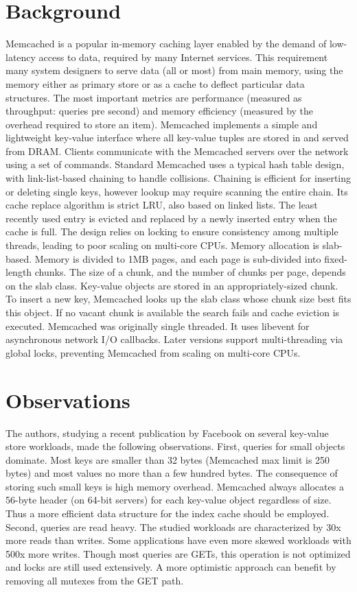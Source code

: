 \documentclass[letterpaper,twocolumn,10pt]{article}
\begin{document}
\section{Background}
Memcached is a popular in-memory caching layer enabled by the demand of low-latency access to data, required by many Internet services. This requirement many system designers to serve data (all or most) from main memory, using the memory either as primary store or as a cache to deflect particular data structures.
The most important metrics are performance (measured as throughput: queries pre second) and memory efficiency (measured by the overhead required to store an item).
Memcached implements a simple and lightweight key-value interface where all key-value tuples are stored in and served from DRAM. Clients communicate with the Memcached servers over the network using a set of commands.
Standard Memcached uses a typical hash table design, with link-list-based chaining to handle collisions. Chaining is efficient for inserting or deleting single keys, however lookup may require scanning the entire chain.
Its cache replace algorithm is strict LRU, also based on linked lists. The least recently used entry is evicted and replaced by a newly inserted entry when the cache is full. The design relies on locking to ensure consistency among multiple threads, leading to poor scaling on multi-core CPUs.
Memory allocation is slab-based. Memory is divided to 1MB pages, and each page is sub-divided into fixed-length chunks. The size of a chunk, and the number of chunks per page, depends on the slab class. Key-value objects are stored in an appropriately-sized chunk. To insert a new key, Memcached looks up the slab class whose chunk size best fits this object. If no vacant chunk is available the search fails and cache eviction is executed.
Memcached was originally single threaded. It uses libevent for asynchronous network I/O callbacks. Later versions support multi-threading via global locks, preventing Memcached from scaling on multi-core CPUs.

\section{Observations}
The authors, studying a recent publication by Facebook on several key-value store workloads, made the following observations.
First, queries for small objects dominate. Most keys are smaller than 32 bytes (Memcached max limit is 250 bytes) and most values no more than a few hundred bytes. The consequence of storing such small keys is high memory overhead. Memcached always allocates a 56-byte header (on 64-bit servers) for each key-value object regardless of size. Thus a more efficient data structure for the index cache should be employed.
Second, queries are read heavy. The studied workloads are characterized by 30x more reads than writes. Some applications have even more skewed workloads with 500x more writes. Though most queries are GETs, this operation is not optimized and locks are still used extensively. A more optimistic approach can benefit by removing all mutexes from the GET path.
\end{document}
